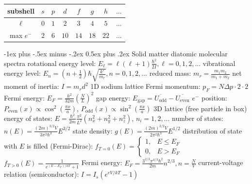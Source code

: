 \documentclass[10pt,landscape]{article}
\makeatletter
\renewcommand{\subsection}{\@startsection{subsection}{2}{0mm}%
                                {-1ex plus -.5ex minus -.2ex}%
                                {0.5ex plus .2ex}%
                                {\normalfont\normalsize\bfseries}}
\newcommand{\spc}{\hspace*{1em}}
\makeatother
\begin{document}
\begin{multicols*}{3}
\begin{center}
\begin{tabular}{ |c| c c c c c| }
 \hline
\end{tabular}
\end{center}
\begin{center}
\begin{tabular}{ |c| c c c c c c c| } 
 \hline
  subshell & $s$ & $p$ & $d$ & $f$ & $g$ & $h$ & $...$\\ 
  \hline
 $\ell$ & $0$ & $1$ & $2$ & $3$ & $4$ & $5$ & $...$\\ 
 \hline
 max $e^-$ & $2$ & $6$ & $10$ & $14$ & $18$ & $22$ & $...$\\
 \hline
\end{tabular}
\end{center}


\subsection{Solid matter}
diatomic molecular spectra
\newline
\spc rotational energy level: $E_{\ell}=\ell(\ell+1)\frac{\hbar^2}{2I},\ell=0,1,2,...$
\newline
\spc vibrational energy level: $E_n=(n+\frac{1}{2})\hbar\sqrt{\frac{k'}{m_r}}, n=0,1,2,...$
\newline
\spc reduced mass: $m_r=\frac{m_1m_2}{m_1+m_2}$
\newline
\spc net moment of inertia: $I=m_rd^2$
\newline
1D sodium lattice
\newline
\spc Fermi momentum: $p_F=N\Delta p\cdot 2\cdot 2$
\newline
\spc Fermi energy: $E_F=\frac{h^2}{32m}(\frac{N}{L})^2$
\newline
\spc gap energy: $E_{\textrm{gap}}=\overline{U_{\textrm{odd}}}-\overline{U_{\textrm{even}}}$
\newline
\spc $e^-$ position: $P_{\textrm{even}}(x)\propto \cos^2(\frac{\pi x}{a})$, $P_{\textrm{odd}}(x)\propto \sin^2(\frac{\pi x}{a})$
\newline
3D lattice (free particle in box)
\newline
\spc energy of states: $E=\frac{\hbar^2}{2m}\frac{\pi^2}{L^2}(n_x^2+n_y^2+n_z^2)$, $n_i=1,2,...$
\newline
\spc number of states: $n(E)= \frac{(2m)^{3/2}V}{3\pi^2\hbar^3}E^{3/2}$
\newline
\spc state density: $g(E)=\frac{(2m)^{3/2}V}{2\pi^2\hbar^3}E^{1/2}$
\newline
\spc distribution of state with $E$ is filled (Fermi-Dirac):
\newline
\spc\spc $f_{T=0}(E)=\left\{\begin{matrix}
1,&E\leq E_F\\ 0,&E>E_F 
\end{matrix}\right.$
\newline
\spc\spc $f_{T>0}(E)=\frac{1}{e^{(E-E_F)/kT}+1}$
\newline
\spc Fermi energy: $E_F=\frac{3^{2/3}\pi^{4/3}\hbar^2}{2m}n^{2/3},n=\frac{N}{V}$
\newline
current-voltage relation (semiconductor): $I=I_s(e^{eV/kT}-1)$


\end{multicols*}
\end{document}
